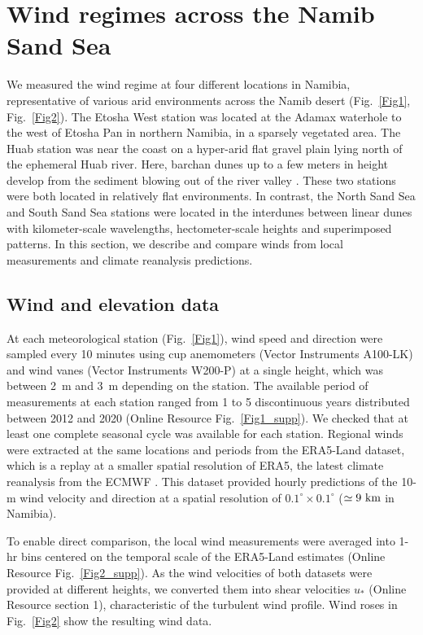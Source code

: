 \section{Wind regimes across the Namib Sand Sea}
\label{sec:sec2}
We measured the wind regime at four different locations in Namibia, representative of various arid environments across the Namib desert (Fig.~\ref{Fig1}, Fig.~\ref{Fig2}). The Etosha West station was located at the Adamax waterhole to the west of Etosha Pan in northern Namibia, in a sparsely vegetated area. The Huab station was near the coast on a hyper-arid flat gravel plain lying north of the ephemeral Huab river. Here, barchan dunes up to a few meters in height develop from the sediment blowing out of the river valley \citep{Nield2017, Hesp1998}. These two stations were both located in relatively flat environments. In contrast, the North Sand Sea and South Sand Sea stations were located in the interdunes between linear dunes with kilometer-scale wavelengths, hectometer-scale heights and superimposed patterns. In this section, we describe and compare winds from local measurements and climate reanalysis predictions.

\subsection{Wind and elevation data}
At each meteorological station (Fig.~\ref{Fig1}), wind speed and direction were sampled every 10 minutes using cup anemometers (Vector Instruments A100-LK) and wind vanes (Vector Instruments W200-P) at a single height, which was between 2~m and 3~m depending on the station. The available period of measurements at each station ranged from 1 to 5 discontinuous years distributed between 2012 and 2020 (Online Resource Fig.~\ref{Fig1_supp}). We checked that at least one complete seasonal cycle was available for each station. Regional winds were extracted at the same locations and periods from the ERA5-Land dataset, which is a replay at a smaller spatial resolution of ERA5, the latest climate reanalysis from the ECMWF \citep{Hersbach2020, munoz2021}. This dataset provided hourly predictions of the 10-m wind velocity and direction at a spatial resolution of $0.1^\circ\times0.1^\circ$ ($\simeq 9~\textup{km}$ in Namibia).

To enable direct comparison, the local wind measurements were averaged into 1-hr bins centered on the temporal scale of the ERA5-Land estimates (Online Resource Fig.~\ref{Fig2_supp}). As the wind velocities of both datasets were provided at different heights, we converted them into shear velocities $u_{*}$ (Online Resource section 1), characteristic of the turbulent wind profile. Wind roses in Fig.~\ref{Fig2} show the resulting wind data.

